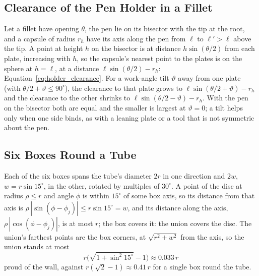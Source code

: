 \subsection{Clearance of the Pen Holder in a Fillet}
Let a fillet have opening $\theta$, the pen lie on its bisector with the tip at the root, and a
capsule of radius $r_h$ have its axis along the pen from $\ell$ to $\ell'>\ell$ above the tip. A
point at height $h$ on the bisector is at distance $h\sin(\theta/2)$ from each plate, increasing
with $h$, so the capsule's nearest point to the plates is on the sphere at $h=\ell$, at a distance
$\ell\sin(\theta/2)-r_h$: Equation~\ref{eq:holder_clearance}. For a work-angle tilt $\vartheta$ away
from one plate (with $\theta/2+\vartheta\le90^\circ$), the clearance to that plate grows to
$\ell\sin(\theta/2+\vartheta)-r_h$ and the clearance to the other shrinks to
$\ell\sin(\theta/2-\vartheta)-r_h$. With the pen on the bisector both are equal and the smaller is
largest at $\vartheta=0$; a tilt helps only when one side binds, as with a leaning plate or a tool that
is not symmetric about the pen.

\subsection{Six Boxes Round a Tube}
Each of the six boxes spans the tube's diameter $2r$ in one direction and $2w$, $w=r\sin15^\circ$, in
the other, rotated by multiples of $30^\circ$. A point of the disc at radius $\rho\le r$ and angle
$\phi$ is within $15^\circ$ of some box axis, so its distance from that axis is
$\rho\,|\sin(\phi-\phi_j)|\le r\sin15^\circ=w$, and its distance along the axis,
$\rho\,|\cos(\phi-\phi_j)|$, is at most $r$; the box covers it: the union covers the disc. The
union's farthest points are the box corners, at $\sqrt{r^2+w^2}$ from the axis, so the union stands at
most
\begin{equation}
r\Big(\sqrt{1+\sin^2 15^\circ}-1\Big)\approx0.033\,r
\end{equation}
proud of the wall, against $r(\sqrt2-1)\approx0.41\,r$ for a single box round the tube.

